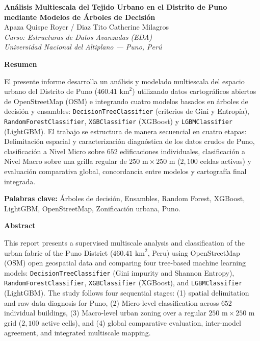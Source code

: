 \documentclass[11pt,a4paper]{article}
\begin{document}
\begin{center}
	{\Large \textbf{Análisis Multiescala del Tejido Urbano en el Distrito de Puno mediante Modelos de Árboles de Decisión}}\\[10pt]
	{\normalsize Apaza Quispe Royer / Diaz Tito Catherine Milagros}\\[4pt]
	{\small \textit{Curso: Estructuras de Datos Avanzadas (EDA) }}\\
	{\small \textit{Universidad Nacional del Altiplano — Puno, Perú}}\\[4pt]
\end{center}

\vspace{6pt}

\noindent\textbf{Resumen}

\noindent El presente informe desarrolla un análisis y modelado multiescala del espacio urbano del Distrito de Puno ($460.41\text{ km}^2$) utilizando datos cartográficos abiertos de OpenStreetMap (OSM) e integrando cuatro modelos basados en árboles de decisión y ensambles: \texttt{DecisionTreeClassifier} (criterios de Gini y Entropía), \texttt{RandomForestClassifier}, \texttt{XGBClassifier} (XGBoost) y \texttt{LGBMClassifier} (LightGBM). El trabajo se estructura de manera secuencial en cuatro etapas: Delimitación espacial y caracterización diagnóstica de los datos crudos de Puno, clasificación a Nivel Micro sobre $652$ edificaciones individuales, clasificación a Nivel Macro sobre una grilla regular de $250\text{ m} \times 250\text{ m}$ ($2{,}100$ celdas activas) y evaluación comparativa global, concordancia entre modelos y cartografía final integrada.

\noindent\textbf{Palabras clave:} Árboles de decisión, Ensambles, Random Forest, XGBoost, LightGBM, OpenStreetMap, Zonificación urbana, Puno.

\vspace{4pt}

\noindent\textbf{Abstract}

\noindent This report presents a supervised multiscale analysis and classification of the urban fabric of the Puno District ($460.41\text{ km}^2$, Peru) using OpenStreetMap (OSM) open geospatial data and comparing four tree-based machine learning models: \texttt{DecisionTreeClassifier} (Gini impurity and Shannon Entropy), \texttt{RandomForestClassifier}, \texttt{XGBClassifier} (XGBoost), and \texttt{LGBMClassifier} (LightGBM). The study follows four sequential stages: (1) spatial delimitation and raw data diagnosis for Puno, (2) Micro-level classification across $652$ individual buildings, (3) Macro-level urban zoning over a regular $250\text{ m} \times 250\text{ m}$ grid ($2{,}100$ active cells), and (4) global comparative evaluation, inter-model agreement, and integrated multiscale mapping.
\end{document}
